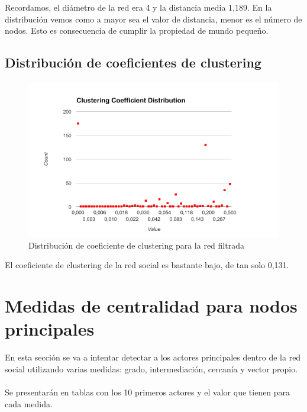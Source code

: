 Recordamos, el diámetro de la red era 4 y la distancia media 1,189. En la distribución vemos como a mayor sea el valor de distancia, menor es el número de nodos. Esto es consecuencia de cumplir la propiedad de mundo pequeño.

\subsection{Distribución de coeficientes de clustering}

\begin{figure}[H]
	\centering
	\includegraphics[width=12cm]{img/clustering-coefficient-distribution-filtered}
	\caption{Distribución de coeficiente de clustering para la red filtrada}
	\label{fig:clustering-coefficient-distribution-filtered}
\end{figure}

El coeficiente de clustering de la red social es bastante bajo, de tan solo 0,131.

\section{Medidas de centralidad para nodos principales}
\label{sec:hubs}

En esta sección se va a intentar detectar a los actores principales dentro de la red social utilizando varias medidas: grado, intermediación, cercanía y vector propio.
\\ \\
Se presentarán en tablas con los 10 primeros actores y el valor que tienen para cada medida.

